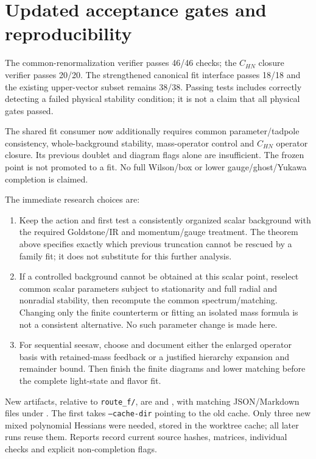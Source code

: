 \documentclass[11pt]{article}
\begin{document}
\section{Updated acceptance gates and reproducibility}
The common-renormalization verifier passes 46/46 checks; the
$C_{HN}$ closure verifier passes 20/20. The strengthened canonical fit
interface passes 18/18 and the existing upper-vector subset remains
38/38. Passing tests includes correctly detecting a failed physical
stability condition; it is not a claim that all physical gates passed.

The shared fit consumer now additionally requires common parameter/tadpole
consistency, whole-background stability, mass-operator control and
$C_{HN}$ operator closure. Its previous doublet and diagram flags alone
are insufficient. The frozen point is not promoted to a fit. No full
Wilson/box or lower gauge/ghost/Yukawa completion is claimed.

The immediate research choices are:
\begin{enumerate}
\item Keep the action and first test a consistently organized scalar
background with the required Goldstone/IR and momentum/gauge treatment.
The theorem above specifies exactly which previous truncation cannot be
rescued by a family fit; it does not substitute for this further analysis.
\item If a controlled background cannot be obtained at this scalar point,
reselect common scalar parameters subject to stationarity and full radial
and nonradial stability, then recompute the common spectrum/matching.
Changing only the finite counterterm or fitting an isolated mass formula
is not a consistent alternative. No such parameter change is made here.
\item For sequential seesaw, choose and document either the enlarged
operator basis with retained-mass feedback or a justified hierarchy
expansion and remainder bound. Then finish the finite diagrams and
lower matching before the complete light-state and flavor fit.
\end{enumerate}

New artifacts, relative to \texttt{route\_f/}, are
 and
, with matching JSON/Markdown
files under . The first takes \texttt{--cache-dir} pointing
to the old  cache. Only three new mixed
polynomial Hessians were needed, stored in the worktree cache; all later
runs reuse them. Reports record current source hashes, matrices,
individual checks and explicit non-completion flags.
\end{document}
